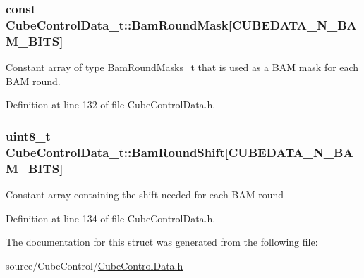 \hypertarget{struct_cube_control_data__t_a27e68e649dcb5beced5b6b7c92419ec5}{}
\subsubsection[{Bam\+Round\+Mask}]{ const Cube\+Control\+Data\+\_\+t\+::\+Bam\+Round\+Mask\mbox{[}{\bf C\+U\+B\+E\+D\+A\+T\+A\+\_\+\+N\+\_\+\+B\+A\+M\+\_\+\+B\+I\+T\+S}\mbox{]}}\label{struct_cube_control_data__t_a27e68e649dcb5beced5b6b7c92419ec5}
Constant array of type \hyperlink{_cube_control_data_8h_a2b6850a8815b785ea51f17c4d979706e}{Bam\+Round\+Masks\+\_\+t} that is used as a B\+A\+M mask for each B\+A\+M round. 

Definition at line 132 of file Cube\+Control\+Data.\+h.

\hypertarget{struct_cube_control_data__t_a945206c33a16ec4249c30e2b698dccff}{}
\subsubsection[{Bam\+Round\+Shift}]{\setlength{\rightskip}{0pt plus 5cm}uint8\+\_\+t Cube\+Control\+Data\+\_\+t\+::\+Bam\+Round\+Shift\mbox{[}{\bf C\+U\+B\+E\+D\+A\+T\+A\+\_\+\+N\+\_\+\+B\+A\+M\+\_\+\+B\+I\+T\+S}\mbox{]}}\label{struct_cube_control_data__t_a945206c33a16ec4249c30e2b698dccff}
Constant array containing the shift needed for each B\+A\+M round 

Definition at line 134 of file Cube\+Control\+Data.\+h.



The documentation for this struct was generated from the following file\+:\begin{DoxyCompactItemize}
\item 
source/\+Cube\+Control/\hyperlink{_cube_control_data_8h}{Cube\+Control\+Data.\+h}\end{DoxyCompactItemize}
